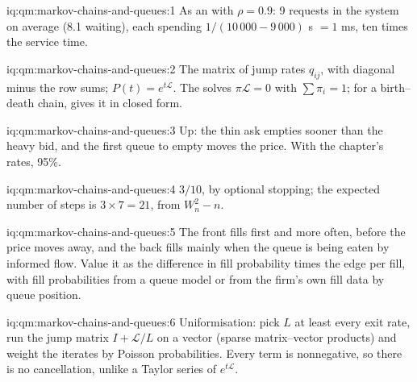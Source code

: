 \begin{solution}{iq:qm:markov-chains-and-queues:1}
As an  with $\rho = 0.9$: 9 requests in the system on average (8.1 waiting), each spending $1/(10\,000 - 9\,000)$
s $= 1$ ms, ten times the service time.
\end{solution}

\begin{solution}{iq:qm:markov-chains-and-queues:2}
The matrix of jump rates $q_{ij}$, with diagonal minus the row sums; $P(t) = e^{t\mathcal L}$. The 
solves $\pi\mathcal L = 0$ with $\sum\pi_i = 1$; for a birth--death chain,  gives it in closed form.
\end{solution}

\begin{solution}{iq:qm:markov-chains-and-queues:3}
Up: the thin ask empties sooner than the heavy bid, and the first queue to empty moves the price. With the
chapter's rates, 95\%.
\end{solution}

\begin{solution}{iq:qm:markov-chains-and-queues:4}
$3/10$, by optional stopping; the expected number of steps is $3 \times 7 = 21$, from $W_n^2 - n$.
\end{solution}

\begin{solution}{iq:qm:markov-chains-and-queues:5}
The front fills first and more often, before the price moves away, and the back fills mainly when the queue is
being eaten by informed flow. Value it as the difference in fill probability times the edge per fill, with fill
probabilities from a queue model or from the firm's own fill data by queue position.
\end{solution}

\begin{solution}{iq:qm:markov-chains-and-queues:6}
Uniformisation: pick $L$ at least every exit rate, run the jump matrix $I + \mathcal L/L$ on a vector (sparse
matrix--vector products) and weight the iterates by Poisson probabilities. Every term is nonnegative, so there is
no cancellation, unlike a Taylor series of $e^{t\mathcal L}$.
\end{solution}
